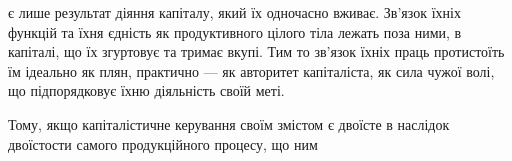 є лише результат діяння капіталу, який їх одночасно вживає.
Зв’язок їхніх функцій та їхня єдність як продуктивного цілого
тіла лежать поза ними, в капіталі, що їх згуртовує та тримає
вкупі. Тим то зв’язок їхніх праць протистоїть їм ідеально як плян,
практично — як авторитет капіталіста, як сила чужої волі, що
підпорядковує їхню діяльність своїй меті.

Тому, якщо капіталістичне керування своїм змістом є двоїсте
в наслідок двоїстости самого продукційного процесу, що ним
\parbreak{}  %
